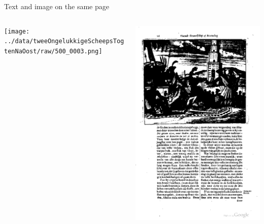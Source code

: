 {
	Text and image on the same page
	\begin{columns}
		\begin{column}{.5\textwidth}
			\texttt{[image: ../data/tweeOngelukkigeScheepsTogtenNaOost/raw/500\_0003.png]}
		\end{column}
		\begin{column}{.5\textwidth}
			\includegraphics[width=.9\columnwidth]{resources/text_and_image_example}
		\end{column}
	\end{columns}
}


